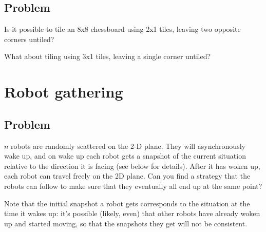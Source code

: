 \documentclass{article}
\begin{document}
\subsection{Problem}

Is it possible to tile an 8x8 chessboard using 2x1 tiles, leaving two opposite corners untiled?

What about tiling using 3x1 tiles, leaving a single corner untiled?


\section{Robot gathering}

\subsection{Problem}

$n$ robots are randomly scattered on the 2-D plane. They will asynchronously wake up, and on wake up each robot gets a snapshot of the current situation relative to the direction it is facing (see below for details). After it has woken up, each robot can travel freely on the 2D plane. Can you find a strategy that the robots can follow to make sure that they eventually all end up at the same point?

Note that the initial snapshot a robot gets corresponds to the situation at the time it wakes up: it's possible (likely, even) that other robots have already woken up and started moving, so that the snapshots they get will not be consistent.
\end{document}
